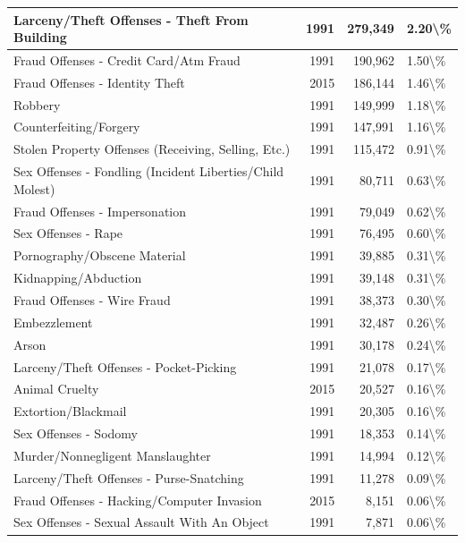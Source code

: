 \documentclass[
]{krantz}
\begin{document}
\begin{longtable}[t]{l|r|r|l}
\hline
Larceny/Theft Offenses - Theft From Building & 1991 & 279,349 & 2.20\textbackslash{}\%\\
\hline
Fraud Offenses - Credit Card/Atm Fraud & 1991 & 190,962 & 1.50\textbackslash{}\%\\
\hline
Fraud Offenses - Identity Theft & 2015 & 186,144 & 1.46\textbackslash{}\%\\
\hline
Robbery & 1991 & 149,999 & 1.18\textbackslash{}\%\\
\hline
Counterfeiting/Forgery & 1991 & 147,991 & 1.16\textbackslash{}\%\\
\hline
Stolen Property Offenses (Receiving, Selling, Etc.) & 1991 & 115,472 & 0.91\textbackslash{}\%\\
\hline
Sex Offenses - Fondling (Incident Liberties/Child Molest) & 1991 & 80,711 & 0.63\textbackslash{}\%\\
\hline
Fraud Offenses - Impersonation & 1991 & 79,049 & 0.62\textbackslash{}\%\\
\hline
Sex Offenses - Rape & 1991 & 76,495 & 0.60\textbackslash{}\%\\
\hline
Pornography/Obscene Material & 1991 & 39,885 & 0.31\textbackslash{}\%\\
\hline
Kidnapping/Abduction & 1991 & 39,148 & 0.31\textbackslash{}\%\\
\hline
Fraud Offenses - Wire Fraud & 1991 & 38,373 & 0.30\textbackslash{}\%\\
\hline
Embezzlement & 1991 & 32,487 & 0.26\textbackslash{}\%\\
\hline
Arson & 1991 & 30,178 & 0.24\textbackslash{}\%\\
\hline
Larceny/Theft Offenses - Pocket-Picking & 1991 & 21,078 & 0.17\textbackslash{}\%\\
\hline
Animal Cruelty & 2015 & 20,527 & 0.16\textbackslash{}\%\\
\hline
Extortion/Blackmail & 1991 & 20,305 & 0.16\textbackslash{}\%\\
\hline
Sex Offenses - Sodomy & 1991 & 18,353 & 0.14\textbackslash{}\%\\
\hline
Murder/Nonnegligent Manslaughter & 1991 & 14,994 & 0.12\textbackslash{}\%\\
\hline
Larceny/Theft Offenses - Purse-Snatching & 1991 & 11,278 & 0.09\textbackslash{}\%\\
\hline
Fraud Offenses - Hacking/Computer Invasion & 2015 & 8,151 & 0.06\textbackslash{}\%\\
\hline
Sex Offenses - Sexual Assault With An Object & 1991 & 7,871 & 0.06\textbackslash{}\%\\

\end{longtable}
\end{document}
